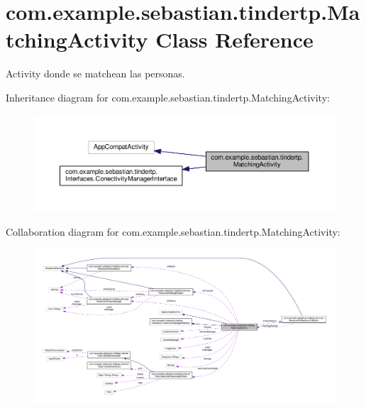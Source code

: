 \hypertarget{classcom_1_1example_1_1sebastian_1_1tindertp_1_1MatchingActivity}{}\section{com.\+example.\+sebastian.\+tindertp.\+Matching\+Activity Class Reference}
\label{classcom_1_1example_1_1sebastian_1_1tindertp_1_1MatchingActivity}


Activity donde se matchean las personas.  




Inheritance diagram for com.\+example.\+sebastian.\+tindertp.\+Matching\+Activity\+:
\nopagebreak
\begin{figure}[H]
\begin{center}
\leavevmode
\includegraphics[width=350pt]{classcom_1_1example_1_1sebastian_1_1tindertp_1_1MatchingActivity__inherit__graph}
\end{center}
\end{figure}


Collaboration diagram for com.\+example.\+sebastian.\+tindertp.\+Matching\+Activity\+:
\nopagebreak
\begin{figure}[H]
\begin{center}
\leavevmode
\includegraphics[width=350pt]{classcom_1_1example_1_1sebastian_1_1tindertp_1_1MatchingActivity__coll__graph}
\end{center}
\end{figure}
